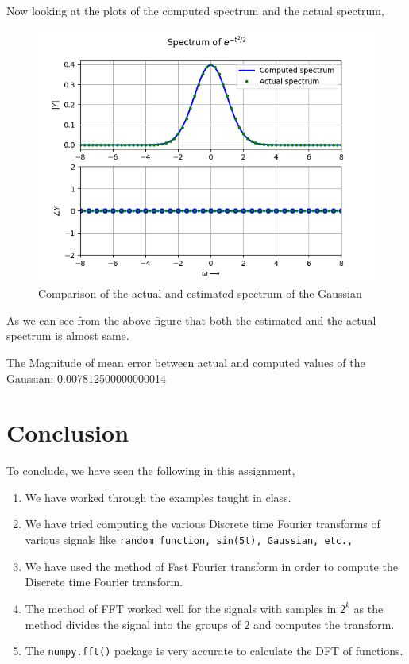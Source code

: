 \documentclass[11pt, a4paper]{article}
\begin{document}
Now looking at the plots of the computed spectrum and the actual spectrum,
\begin{figure}[H]
\centering
\includegraphics[scale=0.7]{Figure_6.png}
\caption{Comparison of the actual and estimated spectrum of the Gaussian}
\label{fig:gauss}
\end{figure}

As we can see from the above figure that both the estimated and the actual spectrum is almost same.

The Magnitude of mean error between actual and computed values of the Gaussian: 0.007812500000000014

\section*{Conclusion}
To conclude, we have seen the following in this assignment,
\begin{enumerate}
    \item We have worked through the examples taught in class.
    \item We have tried computing the various Discrete time Fourier transforms of various signals like \texttt{random function, sin(5t), Gaussian, etc.,}
    \item We have used the method of Fast Fourier transform in order to compute the Discrete time Fourier transform.
    \item The method of FFT worked well for the signals with samples in $2^k$ as the method divides the signal into the groups of 2 and computes the transform.
    \item The \texttt{numpy.fft()} package is very accurate to calculate the DFT of functions.
\end{enumerate}
\end{document}
